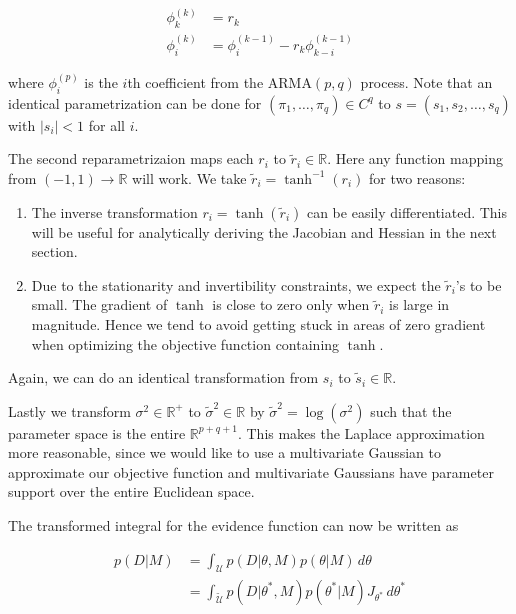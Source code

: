 \begin{align*}
    \phi_k^{(k)} &= r_k\\
    \phi_i^{(k)} &= \phi_i^{(k-1)} - r_k \phi_{k-i}^{(k-1)} \tag{for $i=1, \dots, k-1$}
\end{align*}

where $\phi_i^{(p)}$ is the $i$th coefficient from the ARMA$(p,q)$ process.  Note that an identical parametrization can be done for $(\pi_1, \dots, \pi_q)  \in C^q$ to $s = (s_1, s_2, \dots, s_q)$ with $|s_i| < 1$ for all $i$.

The second reparametrizaion maps each $r_i$ to $\tilde{r}_i \in \mathbb{R}$.  Here any function mapping from $(-1, 1) \rightarrow \mathbb{R}$ will work.  We take $\tilde{r}_i = \tanh^{-1}\left(r_i\right)$ for two reasons:

\begin{enumerate}
    \item The inverse transformation $r_i = \tanh(\tilde{r}_i)$ can be easily differentiated.  This will be useful for analytically deriving the Jacobian and Hessian in the next section.
    
    \item Due to the stationarity and invertibility constraints, we expect the $\tilde{r}_i$'s to be small. The gradient of $\tanh$ is close to zero only when $\tilde{r}_i$ is large in magnitude. Hence we tend to avoid getting stuck in areas of zero gradient when optimizing the objective function containing $\tanh$.
\end{enumerate}

Again, we can do an identical transformation from $s_i$ to $\tilde{s}_i \in \mathbb{R}$.

Lastly we transform $\sigma^2\in \mathbb{R}^+$ to $\tilde{\sigma}^2\in \mathbb{R}$ by
$\tilde{\sigma}^2 = \log(\sigma^2)$
such that the parameter space is the entire $\mathbb{R}^{p+q+1}$. This makes the Laplace approximation more reasonable, since we would like to use a multivariate Gaussian to approximate our objective function and multivariate Gaussians have parameter support over the entire Euclidean space.

The transformed integral for the evidence function can now be written as 

\begin{align*}
    p(D|M) &=  \int_{\mathcal{U}} p(D|\theta, M) p(\theta | M) \, d\theta\\
    &= \int_{\tilde{\mathcal{U}}} p(D|\theta^*, M) p(\theta^* | M) J_{\theta^*} \, d\theta^* \tag{3}
\end{align*}

